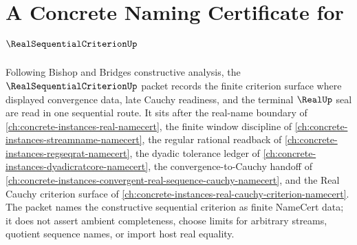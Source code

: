 \chapter{A Concrete Naming Certificate for $\RealSequentialCriterionUp$}
\label{ch:concrete-instances-real-sequential-criterion-namecert}

Following Bishop and Bridges constructive analysis, the $\RealSequentialCriterionUp$ packet records the finite criterion surface where displayed convergence data, late Cauchy readiness, and the terminal $\RealUp$ seal are read in one sequential route. It sits after the real-name boundary of \autoref{ch:concrete-instances-real-namecert}, the finite window discipline of \autoref{ch:concrete-instances-streamname-namecert}, the regular rational readback of \autoref{ch:concrete-instances-regseqrat-namecert}, the dyadic tolerance ledger of \autoref{ch:concrete-instances-dyadicratcore-namecert}, the convergence-to-Cauchy handoff of \autoref{ch:concrete-instances-convergent-real-sequence-cauchy-namecert}, and the Real Cauchy criterion surface of \autoref{ch:concrete-instances-real-cauchy-criterion-namecert}. The packet names the constructive sequential criterion as finite NameCert data; it does not assert ambient completeness, choose limits for arbitrary streams, quotient sequence names, or import host real equality.

